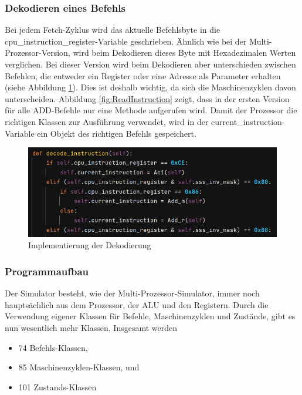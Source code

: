 \documentclass[12pt]{article}
\newcommand{\imgSpaceBefore}{\vspace{10pt}}
\begin{document}
\subsubsection{Dekodieren eines Befehls}
Bei jedem Fetch-Zyklus wird das aktuelle Befehlsbyte in die cpu\_instruction\_register-Variable geschrieben. Ähnlich wie bei der Multi-Prozessor-Version, wird beim Dekodieren dieses Byte mit Hexadezimalen Werten verglichen. Bei dieser Version wird beim Dekodieren aber unterschieden zwischen Befehlen, die entweder ein Register oder eine Adresse als Parameter erhalten (siehe Abbildung \ref{fig:Decode_instr}). Dies ist deshalb wichtig, da sich die Maschinenzyklen davon unterscheiden. Abbildung \ref{fig:ReadInstruction}  zeigt, dass in der ersten Version für alle ADD-Befehle nur eine Methode aufgerufen wird. Damit der Prozessor die richtigen Klassen zur Ausführung verwendet, wird in der current\_instruction-Variable ein Objekt des richtigen Befehls gespeichert.

\imgSpaceBefore
\begin{figure}[H]
\centering
\includegraphics[width=15cm]{bilder/DecodeInstruction}
\caption{Implementierung der Dekodierung}
\label{fig:Decode_instr}
\end{figure}

\subsubsection{Programmaufbau}

Der Simulator besteht, wie der Multi-Prozessor-Simulator, immer noch hauptsächlich aus dem Prozessor, der ALU und den Registern. Durch die Verwendung eigener Klassen für Befehle, Maschinenzyklen und Zustände, gibt es nun wesentlich mehr Klassen. Insgesamt werden

\begin{itemize}
\item 74 Befehls-Klassen,
\item 85 Maschinenzyklen-Klassen, und
\item 101 Zustands-Klassen
\end{itemize}
\end{document}
